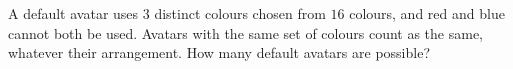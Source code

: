 A default avatar uses $3$ distinct colours chosen from $16$ colours, and red and blue cannot both be used. Avatars with the same set of colours count as the same, whatever their arrangement. How many default avatars are possible?
